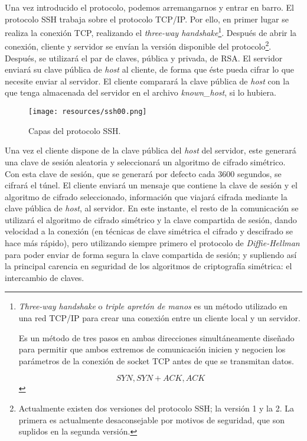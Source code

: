 \documentclass[a4paper, 11pt, titlepage]{article}
\begin{document}
    Una vez introducido el protocolo, podemos arremangarnos y entrar en barro. El protocolo 
    SSH trabaja sobre el protocolo TCP/IP. Por ello, en primer lugar se realiza la conexión 
    TCP, realizando el \textit{three-way handshake}\footnote{
        \textit{Three-way handshake} o \textit{triple apretón de manos} es un método 
        utilizado en una red TCP/IP para crear una conexión entre un cliente local y 
        un servidor.

        Es un método de tres pasos en ambas direcciones simultáneamente diseñado para 
        permitir que ambos extremos de comunicación inicien y negocien los parámetros 
        de la conexión de socket TCP antes de que se transmitan datos.

        \[SYN, SYN+ACK, ACK\]
    }. Después de abrir la conexión, cliente y servidor se envían la versión disponible 
    del protocolo\footnote{ \label{versiones}
        Actualmente existen dos versiones del protocolo SSH; la versión 1 y la 2. La primera 
        es actualmente desaconsejable por motivos de seguridad, que son suplidos en la segunda 
        versión.
    }. Después, se utilizará el par de claves, pública y privada, de RSA. El servidor enviará 
    su clave pública de \textit{host} al cliente, de forma que éste pueda cifrar lo que necesite 
    enviar al servidor. El cliente comparará la clave pública de \textit{host} con la que 
    tenga almacenada del servidor en el archivo \textit{known\_host}, si lo hubiera. 

    \begin{figure}[htp]
        \centering
        \texttt{[image: resources/ssh00.png]}
        \caption{Capas del protocolo SSH.}
        \label{ssh00}
    \end{figure}

    Una vez el cliente dispone de la clave pública del \textit{host} del servidor, este 
    generará una clave de sesión aleatoria y seleccionará un algoritmo de cifrado simétrico.
    Con esta clave de sesión, que se generará por defecto cada 3600 segundos, se cifrará el 
    túnel. El cliente enviará un mensaje que contiene la clave de sesión y el algoritmo de 
    cifrado seleccionado, información que viajará cifrada mediante la clave pública de \textit{host},
    al servidor. En este instante, el resto de la comunicación se utilizará el algoritmo de 
    cifrado simétrico y la clave compartida de sesión, dando velocidad a la conexión (en técnicas 
    de clave simétrica el cifrado y descifrado se hace más rápido), pero utilizando siempre 
    primero el protocolo de \textit{Diffie-Hellman} para poder enviar de forma segura 
    la clave compartida de sesión; y supliendo así la principal carencia en seguridad de los algoritmos 
    de criptografía simétrica: el intercambio de claves.
\end{document}
